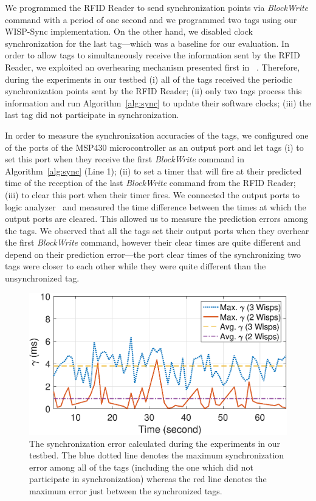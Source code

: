 \documentclass[10pt,journal,compsoc]{IEEEtran}
\begin{document}
We programmed the RFID Reader to send synchronization points via \emph{BlockWrite} command with a period of one second and we programmed two tags using our WISP-Sync implementation. On the other hand, we disabled clock synchronization for the last tag---which was a baseline for our evaluation.  In order to allow tags to simultaneously receive the information sent by the RFID Reader, we exploited an overhearing mechanism presented first in ~\cite[Section III-B]{stork:2017}. Therefore, during the experiments in our testbed (i) all of the tags received the periodic synchronization points sent by the RFID Reader; (ii) only two tags process this information and run Algorithm~\ref{alg:sync} to update their software clocks; (iii) the last tag did not participate in synchronization.

In order to measure the synchronization accuracies of the tags, we configured one of the ports of the MSP430 microcontroller as an output port and let tags (i) to set this port when they receive the first \emph{BlockWrite} command in Algorithm~\ref{alg:sync} (Line 1); (ii) to set a timer that will fire at their predicted time of the reception of the last \emph{BlockWrite} command from the RFID Reader; (iii) to clear this port when their timer fires. We connected the output ports to logic analyzer~\cite{saleae} and measured the time difference between the times at which the output ports are cleared. This allowed us to measure the prediction errors among the tags. We observed that all the tags set their output ports when they overhear the first \emph{BlockWrite} command, however their clear times are quite different and depend on their prediction error---the port clear times of the synchronizing two tags were closer to each other while they were quite different than the unsynchronized tag.

\begin{figure}
	\centering
	\includegraphics[width=0.9\columnwidth]{figures/multiwisp-experiments.eps}
	\caption{\label{fig:multi-sync-results}The synchronization error calculated during the experiments in our testbed. The blue dotted line denotes the maximum synchronization error among all of the tags (including the one which did not participate in synchronization) whereas the red line denotes the maximum error just between the synchronized tags.} 
\end{figure}
\end{document}
